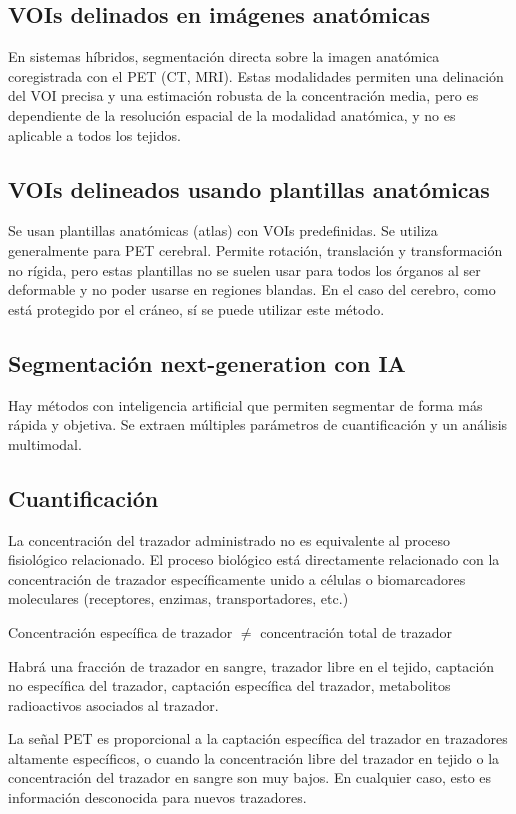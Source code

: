 \subsection{VOIs delinados en imágenes anatómicas}
En sistemas híbridos, segmentación directa sobre la imagen anatómica coregistrada con el PET (CT, MRI). Estas modalidades permiten una delinación del VOI precisa y una estimación robusta de la concentración media, pero es dependiente de la resolución espacial de la modalidad anatómica, y no es aplicable a todos los tejidos.

\subsection{VOIs delineados usando plantillas anatómicas}
Se usan plantillas anatómicas (atlas) con VOIs predefinidas. Se utiliza generalmente para PET cerebral.
Permite rotación, translación y transformación no rígida, pero estas plantillas no se suelen usar para todos los órganos al ser deformable y no poder usarse en regiones blandas. En el caso del cerebro, como está protegido por el cráneo, sí se puede utilizar este método.

\subsection{Segmentación next-generation con IA}
Hay métodos con inteligencia artificial que permiten segmentar de forma más rápida y objetiva. Se extraen múltiples parámetros de cuantificación y un análisis multimodal. 

\subsection{Cuantificación}
La concentración del trazador administrado no es equivalente al proceso fisiológico relacionado. El proceso biológico está directamente relacionado con la concentración de trazador específicamente unido a células o biomarcadores moleculares (receptores, enzimas, transportadores, etc.)

Concentración específica de trazador $\neq$ concentración total de trazador

Habrá una fracción de trazador en sangre, trazador libre en el tejido, captación no específica del trazador, captación específica del trazador, metabolitos radioactivos asociados al trazador.

La señal PET es proporcional a la captación específica del trazador en trazadores altamente específicos, o cuando la concentración libre del trazador en tejido o la concentración del trazador en sangre son muy bajos. En cualquier caso, esto es información desconocida para nuevos trazadores. 

